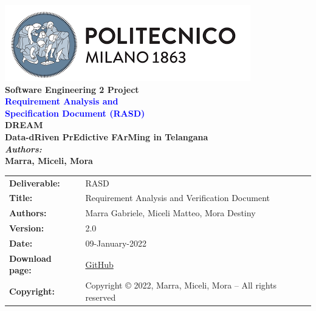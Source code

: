 
\usepackage{longtable} 
\usepackage{multicol}




\setcounter{figure_counter}{1}

\setcounter{table_counter}{1}



\begin{titlepage}

\centering
{\includegraphics[scale=0.7]{Images/PolimiLogo}}\\[3.5cm]

{\textbf{\Large{Software Engineering 2 Project}}}\\ [3.5cm]




\centering
{\textcolor{Blue}{\textbf{\Huge{Requirement Analysis and\\ Specification Document (RASD)}}}} \\ [3.5cm]

{\textbf{{\huge{DREAM}}\\[2mm]\large{Data-dRiven PrEdictive FArMing in Telangana}}}\\ [3.5cm]

{\textbf{\large{\textit{Authors:}}\\[1mm]\Large{Marra, Miceli, Mora}}}\\ [3cm]

\end{titlepage}

\begin{table}[h!]
\begin{tabu} to \textwidth { X[0.3,r,p] X[0.7,l,p] }
\hline

\textbf{Deliverable:} & RASD\\
\textbf{Title:} & Requirement Analysis and Verification Document \\
\textbf{Authors:} & Marra Gabriele, Miceli Matteo, Mora Destiny \\
\textbf{Version:} & 2.0 \\ 
\textbf{Date:} & 09-January-2022 \\
\textbf{Download page:} & \href{https://github.com/gabrielemarra/MarraMiceliMora}{GitHub} \\
\textbf{Copyright:} & Copyright © 2022, Marra, Miceli, Mora – All rights reserved \\
\hline
\end{tabu}
\end{table}




